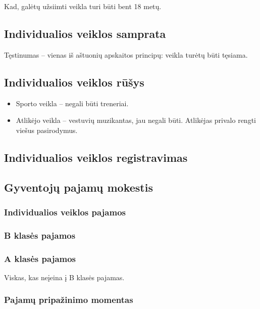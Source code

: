 Kad, galėtų užsiimti veikla turi būti bent 18 metų.

\subsection{Individualios veiklos samprata}

Tęstinumas – vienas iš aštuonių apskaitos principų: veikla turėtų būti
tęsiama. 

\subsection{Individualios veiklos rūšys}

\begin{itemize}
  \item Sporto veikla – negali būti treneriai.
  \item Atlikėjo veikla – vestuvių muzikantas, jau negali būti.
    Atlikėjas privalo rengti viešus pasirodymus.
\end{itemize}

\subsection{Individualios veiklos registravimas}

\subsection{Gyventojų pajamų mokestis}

\subsubsection{Individualios veiklos pajamos}

\subsubsection{B klasės pajamos}

\subsubsection{A klasės pajamos}

Viskas, kas neįeina į B klasės pajamas.

\subsubsection{Pajamų pripažinimo momentas}

